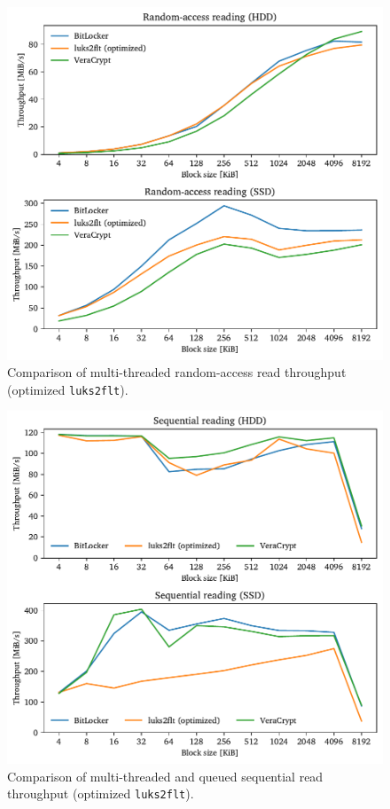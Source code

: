 \begin{figure}[htb!]
	\center
	\includegraphics[scale=1]{../fig/performance.hwexperiments.optrandthreads.pdf}
	\caption[
		Comparison of multi-threaded random-access read throughput (optimized \texttt{luks2flt})
	]{
		Comparison of multi-threaded random-access read throughput (optimized \texttt{luks2flt}). 
	}
	\label{fig:performance.hwexperiments.optrandthreads}
\end{figure}

\begin{figure}[htb!]
	\center
	\includegraphics[scale=1]{../fig/performance.hwexperiments.optseqthreadsqueue.pdf}
	\caption[
		Comparison of multi-threaded and queued sequential read throughput (optimized \texttt{luks2flt})
	]{
		Comparison of multi-threaded and queued sequential read throughput (optimized \texttt{luks2flt}). 
	}
	\label{fig:performance.hwexperiments.optseqthreadsqueue}
\end{figure}

